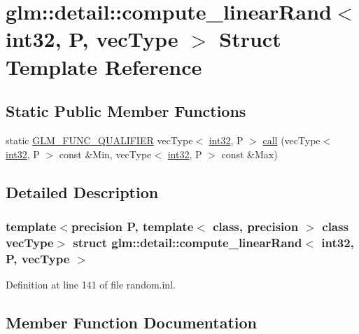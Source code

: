 \hypertarget{structglm_1_1detail_1_1compute__linear_rand_3_01int32_00_01_p_00_01vec_type_01_4}{}\section{glm\+::detail\+::compute\+\_\+linear\+Rand$<$ int32, P, vec\+Type $>$ Struct Template Reference}
\label{structglm_1_1detail_1_1compute__linear_rand_3_01int32_00_01_p_00_01vec_type_01_4}
\subsection*{Static Public Member Functions}
\begin{DoxyCompactItemize}
\item 
static \mbox{\hyperlink{setup_8hpp_a33fdea6f91c5f834105f7415e2a64407}{G\+L\+M\+\_\+\+F\+U\+N\+C\+\_\+\+Q\+U\+A\+L\+I\+F\+I\+ER}} vec\+Type$<$ \mbox{\hyperlink{namespaceglm_1_1detail_a9f85b4efeca416cdcec2fd08939a2e17}{int32}}, P $>$ \mbox{\hyperlink{structglm_1_1detail_1_1compute__linear_rand_3_01int32_00_01_p_00_01vec_type_01_4_ac09eec8e177afcecc1e0d52d6d9951b3}{call}} (vec\+Type$<$ \mbox{\hyperlink{namespaceglm_1_1detail_a9f85b4efeca416cdcec2fd08939a2e17}{int32}}, P $>$ const \&Min, vec\+Type$<$ \mbox{\hyperlink{namespaceglm_1_1detail_a9f85b4efeca416cdcec2fd08939a2e17}{int32}}, P $>$ const \&Max)
\end{DoxyCompactItemize}


\subsection{Detailed Description}
\subsubsection*{template$<$precision P, template$<$ class, precision $>$ class vec\+Type$>$\newline
struct glm\+::detail\+::compute\+\_\+linear\+Rand$<$ int32, P, vec\+Type $>$}



Definition at line 141 of file random.\+inl.



\subsection{Member Function Documentation}
\mbox{\label{structglm_1_1detail_1_1compute__linear_rand_3_01int32_00_01_p_00_01vec_type_01_4_ac09eec8e177afcecc1e0d52d6d9951b3}} 
